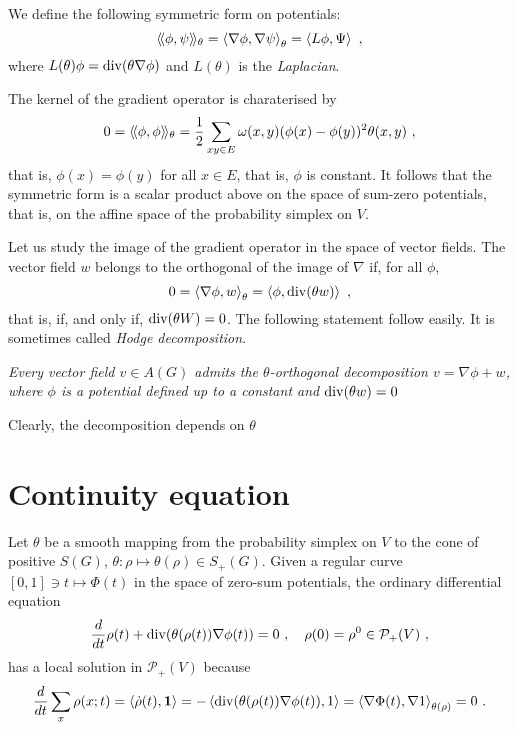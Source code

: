 \documentclass[12pt,a4paper]{amsart}
\begin{document}
We define the following symmetric form on potentials:
\begin{equation*}
  \Scalarat \theta \phi \psi = \scalarat \theta {\nabla\phi}
  {\nabla\psi} = \scalarof {L\phi} \Psi \ , 
\end{equation*}
where $L(\theta) \phi = \Div(\theta\nabla\phi)$ and $L(\theta)$ is the
\emph{Laplacian}.

The kernel of the gradient operator is charaterised by
\begin{equation*}
  0 = \Scalarat \theta \phi \phi = \frac 12 \sum_{xy \in E} \omega(x,y)
  (\phi(x) - \phi(y))^2 \theta(x,y) \ , 
\end{equation*}
that is, $\phi(x) = \phi(y)$ for all $x \in E$, that is, $\phi$ is
constant. It follows that the symmetric form is a scalar product above
on the space of sum-zero potentials, that is, on the affine space of
the probability simplex on $V$.

Let us study the image of the gradient operator in the space of vector
fields. The vector field $w$ belongs to the  orthogonal of the image of
$\nabla$ if, for all $\phi$,
\begin{equation*}
  0 = \scalarat \theta {\nabla \phi} w = \scalarof \phi {\Div(\theta
    w)} \ ,
\end{equation*}
that is, if, and only if, $\Div(\theta W) = 0$. The following
statement follow easily. It is sometimes called \emph{Hodge decomposition}.

\emph{Every vector field $v \in A(G)$ admits the $\theta$-orthogonal
  decomposition $v = \nabla \phi + w$, where $\phi$ is a potential
  defined up to a constant and $\Div(\theta w) = 0$}

Clearly, the decomposition depends on $\theta$

\section{Continuity equation}
\label{sec:continuity}

Let $\theta$ be a smooth mapping from the probability simplex on $V$ to the
cone of positive $S(G)$, $\theta \colon \rho \mapsto \theta(\rho) \in
S_+(G)$. Given a regular curve $[0,1] \ni t \mapsto \Phi(t)$ in the
space of zero-sum potentials, the ordinary differential equation
\begin{equation*}
  \derivby t \rho(t) +  \Div(\theta(\rho(t))\nabla \phi(t)) = 0 \ , \quad
  \rho(0) = \rho^0 \in \mathcal P_+(V) \ ,
\end{equation*}
has a local solution in $\mathcal P_+(V)$ because
\begin{equation*}
  \derivby t \sum_x \rho(x;t) = \scalarof {\dot \rho(t)}{\one} = 
 - \scalarof {\Div(\theta(\rho(t))\nabla \phi(t))}{1} = \scalarat
 {\theta(\rho)} {\nabla \Phi(t)}{\nabla 1}
 = 0 \ .
\end{equation*}
\end{document}
